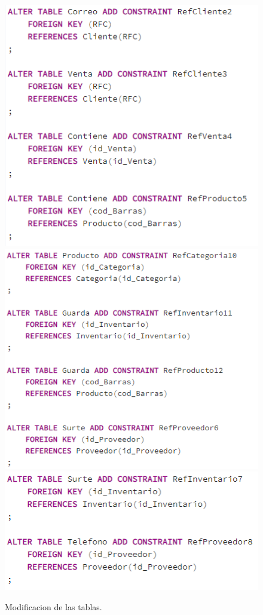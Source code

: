 \documentclass[12pt,letterpaper]{article}
\begin{document}
	\begin{figure}[H]
		\centering
		\includegraphics[scale=0.74]{Documentacion/img/Modificaciones_Parte1.PNG}
		\includegraphics[scale=0.74]{Documentacion/img/Modificaciones_Parte2.PNG}
		\includegraphics[scale=0.75]{Documentacion/img/Modificaciones_Parte3.PNG}
		\caption{Modificacion de las tablas.}
	\end{figure}
\end{document}
